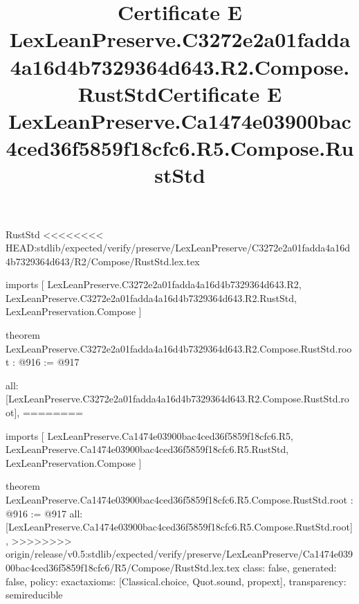 \begin{lexlean}{RustStd}
<<<<<<<< HEAD:stdlib/expected/verify/preserve/LexLeanPreserve/C3272e2a01fadda4a16d4b7329364d643/R2/Compose/RustStd.lex.tex
\title{Certificate E LexLeanPreserve.C3272e2a01fadda4a16d4b7329364d643.R2.Compose.RustStd}
\begin{coremodule}
imports [
  LexLeanPreserve.C3272e2a01fadda4a16d4b7329364d643.R2,
  LexLeanPreserve.C3272e2a01fadda4a16d4b7329364d643.R2.RustStd,
  LexLeanPreservation.Compose
]

theorem LexLeanPreserve.C3272e2a01fadda4a16d4b7329364d643.R2.Compose.RustStd.root : @916 := @917 {
  all: [LexLeanPreserve.C3272e2a01fadda4a16d4b7329364d643.R2.Compose.RustStd.root],
========
\title{Certificate E LexLeanPreserve.Ca1474e03900bac4ced36f5859f18cfc6.R5.Compose.RustStd}
\begin{coremodule}
imports [
  LexLeanPreserve.Ca1474e03900bac4ced36f5859f18cfc6.R5,
  LexLeanPreserve.Ca1474e03900bac4ced36f5859f18cfc6.R5.RustStd,
  LexLeanPreservation.Compose
]

theorem LexLeanPreserve.Ca1474e03900bac4ced36f5859f18cfc6.R5.Compose.RustStd.root : @916 := @917 {
  all: [LexLeanPreserve.Ca1474e03900bac4ced36f5859f18cfc6.R5.Compose.RustStd.root],
>>>>>>>> origin/release/v0.5:stdlib/expected/verify/preserve/LexLeanPreserve/Ca1474e03900bac4ced36f5859f18cfc6/R5/Compose/RustStd.lex.tex
  class: false,
  generated: false,
  policy: exact{axioms: [Classical.choice, Quot.sound, propext]},
  transparency: semireducible
}


\end{coremodule}}
\end{coremodule}
\end{lexlean}

